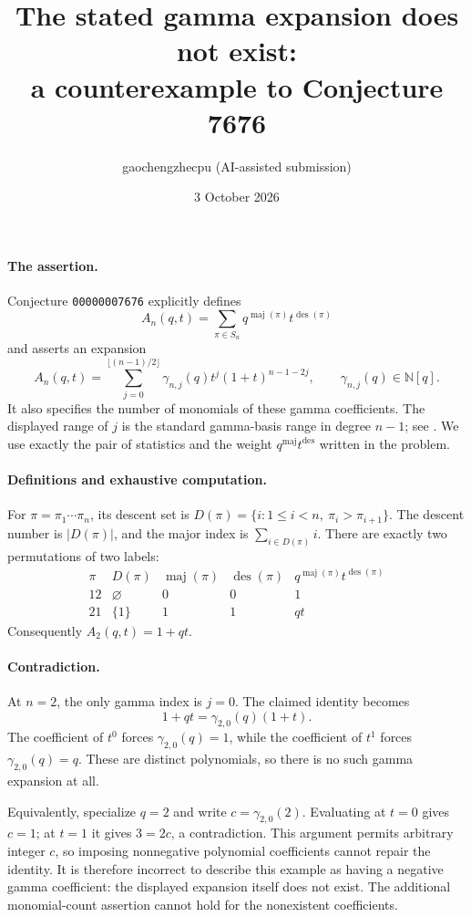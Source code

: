 \documentclass[11pt]{article}
\title{The stated gamma expansion does not exist:\\a counterexample to Conjecture 7676}
\author{gaochengzhecpu (AI-assisted submission)}
\date{3 October 2026}
\begin{document}
\maketitle

\paragraph{The assertion.}
Conjecture \texttt{00000007676} explicitly defines
\[
 A_n(q,t)=\sum_{\pi\in S_n}q^{\operatorname{maj}(\pi)}t^{\operatorname{des}(\pi)}
\]
and asserts an expansion
\[
 A_n(q,t)=\sum_{j=0}^{\lfloor(n-1)/2\rfloor}
 \gamma_{n,j}(q)t^j(1+t)^{n-1-2j},
 \qquad\gamma_{n,j}(q)\in\mathbb N[q].
\]
It also specifies the number of monomials of these gamma coefficients.
The displayed range of $j$ is the standard gamma-basis range in degree
$n-1$; see \cite[Introduction]{LZ}. We use exactly the pair of statistics
and the weight $q^{\operatorname{maj}}t^{\operatorname{des}}$ written in
the problem.

\paragraph{Definitions and exhaustive computation.}
For $\pi=\pi_1\cdots\pi_n$, its descent set is
$D(\pi)=\{i:1\le i<n,\ \pi_i>\pi_{i+1}\}$.
The descent number is $|D(\pi)|$, and the major index is
$\sum_{i\in D(\pi)}i$. There are exactly two permutations of two labels:
\[
\begin{array}{c|c|c|c|c}
 \pi & D(\pi) & \operatorname{maj}(\pi)&\operatorname{des}(\pi)&
 q^{\operatorname{maj}(\pi)}t^{\operatorname{des}(\pi)}\\\hline
 12 & \varnothing &0&0&1\\
 21 & \{1\} &1&1&qt
\end{array}
\]
Consequently $A_2(q,t)=1+qt$.

\paragraph{Contradiction.}
At $n=2$, the only gamma index is $j=0$. The claimed identity becomes
\[
 1+qt=\gamma_{2,0}(q)(1+t).
\]
The coefficient of $t^0$ forces $\gamma_{2,0}(q)=1$, while the
coefficient of $t^1$ forces $\gamma_{2,0}(q)=q$. These are distinct
polynomials, so there is no such gamma expansion at all.

Equivalently, specialize $q=2$ and write $c=\gamma_{2,0}(2)$. Evaluating
at $t=0$ gives $c=1$; at $t=1$ it gives $3=2c$, a contradiction.
This argument permits arbitrary integer $c$, so imposing nonnegative
polynomial coefficients cannot repair the identity. It is therefore
incorrect to describe this example as having a negative gamma
coefficient: the displayed expansion itself does not exist. The
additional monomial-count assertion cannot hold for the nonexistent
coefficients.
\end{document}
